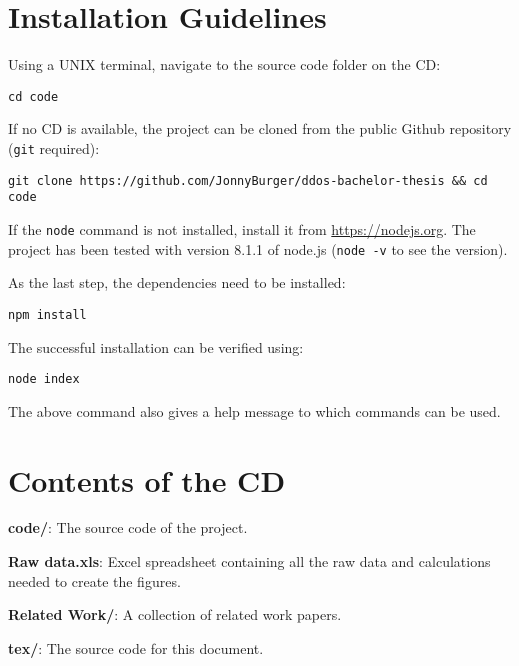 \appendix

\chapter{Installation Guidelines}

Using a UNIX terminal, navigate to the source code folder on the CD:

\texttt{cd code}

If no CD is available, the project can be cloned from the public Github repository (\texttt{git} required):

\texttt{git clone https://github.com/JonnyBurger/ddos-bachelor-thesis \&\& cd code}

If the  \texttt{node} command is not installed, install it from \url{https://nodejs.org}. The project has been tested with version 8.1.1 of node.js (\texttt{node -v} to see the version).

As the last step, the dependencies need to be installed:

\texttt{npm install}

The successful installation can be verified using:

\texttt{node index}

The above command also gives a help message to which commands can be used.

\chapter{Contents of the CD}

\textbf{code/}: The source code of the project.

\textbf{Raw data.xls}: Excel spreadsheet containing all the raw data and calculations needed to create the figures.

\textbf{Related Work/}: A collection of related work papers.

\textbf{tex/}: The source code for this document.
